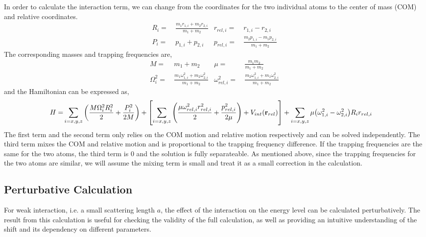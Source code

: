 In order to calculate the interaction term, we can change from the coordinates for
the two individual atoms to the center of mass (COM) and relative coordinates.
\begin{align*}
  R_i=&\ \frac{m_1r_{1,i}+m_2r_{2,i}}{m_1+m_2}&r_{rel,i}=&\ r_{1,i}-r_{2,i}\\
  P_i=&\ p_{1,i}+p_{2,i}&p_{rel,i}=&\ \frac{m_2p_{1,i}-m_1p_{2,i}}{m_1+m_2}
\end{align*}
The corresponding masses and trapping frequencies are,
\begin{align*}
  M=&\ m_1+m_2&\mu=&\ \frac{m_1m_2}{m_1+m_2}\\
  \Omega_i^2=&\ \frac{m_1\omega_{1,i}^2+m_2\omega_{2,i}^2}{m_1+m_2}&\omega_{rel,i}^2=&\ \frac{m_2\omega_{1,i}^2+m_1\omega_{2,i}^2}{m_1+m_2}
\end{align*}
and the Hamiltonian can be expressed as,
\begin{align*}
  H=&\sum_{i=x,y,z}{\left({\frac{M\Omega_{i}^2R_{i}^2}{2}+\frac{P_{i}^2}{2M}}\right)}+
      \left[\sum_{i=x,y,z}{\left({\frac{\mu\omega_{rel,i}^2r_{rel,i}^2}{2}+\frac{p_{rel,i}^2}{2\mu}}\right)}+
      V_{int}{\left({\mathbf{r}_{rel}}\right)}\right]+
      \sum_{i=x,y,z}\mu{\left({\omega_{1,i}^2 - \omega_{2,i}^2}\right)}R_ir_{rel,i}
\end{align*}
The first term and the second term only relies on the COM motion and relative motion
respectively and can be solved independently. The third term mixes the COM and relative motion
and is proportional to the trapping frequency difference.
If the trapping frequencies are the same for the two atoms, the third term is $0$ and
the solution is fully separateable.
As mentioned above, since the trapping frequencies for the two atoms are similar,
we will assume the mixing term is small and treat it as a small correction in the calculation.

\subsection{Perturbative Calculation}

For weak interaction, i.e. a small scattering length $a$, the effect of the interaction
on the energy level can be calculated perturbatively.
The result from this calculation is useful for checking the validity of the full calculation,
as well as providing an intuitive understanding of the shift and its dependency
on different parameters.

